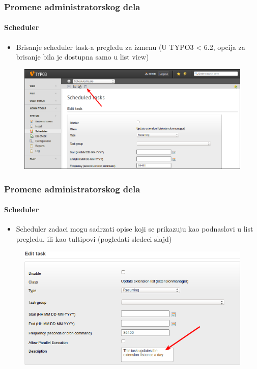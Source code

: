
\begin{frame}[fragile]
	\frametitle{Promene administratorskog dela}
	\framesubtitle{Scheduler}

	\begin{itemize}
		\item Brisanje scheduler task-a pregledu za izmenu\newline
			\small(U TYPO3 < 6.2, opcija za brisanje bila je dostupna samo u list view)\normalsize
	\end{itemize}

	\begin{figure}
		\includegraphics[width=0.95\linewidth]{Images/BackendChanges/DeleteSchedulerTaskInEditView.png}
	\end{figure}

\end{frame}


\begin{frame}[fragile]
	\frametitle{Promene administratorskog dela}
	\framesubtitle{Scheduler}

	\begin{itemize}
		\item Scheduler zadaci mogu sadrzati opise koji se prikazuju kao podnaslovi u list pregledu, ili kao tultipovi (pogledati sledeci slajd)
	\end{itemize}

	\begin{figure}
		\includegraphics[width=0.7\linewidth]{Images/BackendChanges/SchedulerTaskDescription.png}
	\end{figure}

\end{frame}

